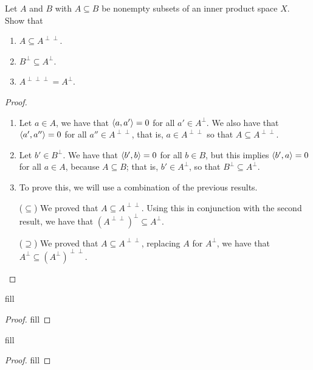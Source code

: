 \begin{exercise}{7}
Let $A$ and $B$ with $A \subseteq B$ be nonempty subsets of an inner product space $X$.
Show that
\begin{enumerate}
    \item $A \subseteq A^{\perp \perp}$.
    \item $B^\perp \subseteq A^\perp$.
    \item $A^{\perp \perp \perp} = A^\perp$.
\end{enumerate}
\end{exercise}
\begin{proof}
\begin{enumerate}
    \item Let $a \in A$, we have that $\langle a,a'\rangle = 0$ for all $a'\in A^\perp$.
    We also have that $\langle a', a''\rangle = 0$ for all $a'' \in A^{\perp \perp}$, that is, $a \in A^{\perp \perp}$ so that $A \subseteq A^{\perp \perp}$.
    \item Let $b' \in B^\perp$.
    We have that $\langle b', b\rangle = 0$ for all $b \in B$, but this implies $\langle b', a\rangle = 0$ for all $a \in A$, because $A \subseteq B$;
    that is, $b' \in A^\perp$, so that $B^\perp \subseteq A^\perp$.
    \item To prove this, we will use a combination of the previous results.
    
    ($\subseteq$)
    We proved that $A \subseteq A^{\perp \perp}$.
    Using this in conjunction with the second result, we have that $(A^{\perp \perp})^\perp \subseteq A^\perp$.

    ($\supseteq$)
    We proved that $A \subseteq A^{\perp \perp}$, replacing $A$ for $A^\perp$, we have that $A^\perp \subseteq (A^\perp)^{\perp \perp}$.
\end{enumerate}
\end{proof}

\begin{exercise}{9}
fill
\end{exercise}
\begin{proof}
fill
\end{proof}

\begin{exercise}{10}
fill
\end{exercise}
\begin{proof}
fill
\end{proof}